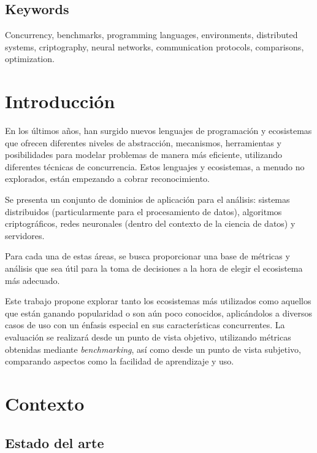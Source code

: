 \documentclass[11pt]{article}
\let\Oldsection\section
\renewcommand{\section}{\FloatBarrier\Oldsection}
\let\Oldsubsection\subsection
\renewcommand{\subsection}{\FloatBarrier\Oldsubsection}
\newcommand{\english}[1]{\textit{#1}}
\begin{document}
\subsection{Keywords}

\begin{otherlanguage}{english}
Concurrency, benchmarks, programming languages, environments, distributed systems, criptography, neural networks, communication protocols, comparisons, optimization.
\end{otherlanguage}

\newpage

\section{Introducción}

En los últimos años, han surgido nuevos lenguajes de programación y ecosistemas que ofrecen diferentes niveles de abstracción, mecanismos, herramientas y posibilidades para modelar problemas de manera más eficiente, utilizando diferentes técnicas de concurrencia. Estos lenguajes y ecosistemas, a menudo no explorados, están empezando a cobrar reconocimiento.

Se presenta un conjunto de dominios de aplicación para el análisis: sistemas distribuidos (particularmente para el procesamiento de datos), algoritmos criptográficos, redes neuronales (dentro del contexto de la ciencia de datos) y servidores.

Para cada una de estas áreas, se busca proporcionar una base de métricas y análisis que sea útil para la toma de decisiones a la hora de elegir el ecosistema más adecuado.

Este trabajo propone explorar tanto los ecosistemas más utilizados como aquellos que están ganando popularidad o son aún poco conocidos, aplicándolos a diversos casos de uso con un énfasis especial en sus características concurrentes. La evaluación se realizará desde un punto de vista objetivo, utilizando métricas obtenidas mediante \english{benchmarking}, así como desde un punto de vista subjetivo, comparando aspectos como la facilidad de aprendizaje y uso.

\newpage

\section{Contexto}

\subsection{Estado del arte}
\end{document}
